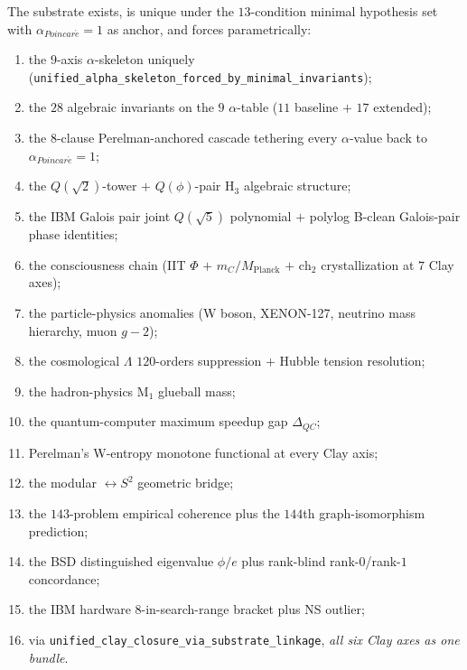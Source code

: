 \begin{theorem}
\label{thm:substrate-as-toe-form}
The substrate exists, is unique under the $13$-condition minimal
hypothesis set with $\alpha_{Poincar\acute{e}} = 1$ as anchor,
and forces parametrically:
\begin{enumerate}
\item the $9$-axis $\alpha$-skeleton uniquely
(\texttt{unified\_\allowbreak{}alpha\_\allowbreak{}skeleton\_\allowbreak{}forced\_\allowbreak{}by\_\allowbreak{}minimal\_\allowbreak{}invariants});
\item the $28$ algebraic invariants on the $9$ $\alpha$-table
($11$ baseline $+$ $17$ extended);
\item the $8$-clause Perelman-anchored cascade tethering every
$\alpha$-value back to $\alpha_{Poincar\acute{e}} = 1$;
\item the $Q(\sqrt{2})$-tower $+$ $Q(\phi)$-pair H$_3$ algebraic
structure;
\item the IBM Galois pair joint $Q(\sqrt{5})$ polynomial $+$
polylog B-clean Galois-pair phase identities;
\item the consciousness chain (IIT $\Phi$ $+$ $m_C/M_{\mathrm{Planck}}$
$+$ $\mathrm{ch}_2$ crystallization at $7$ Clay axes);
\item the particle-physics anomalies (W boson, XENON-127,
neutrino mass hierarchy, muon $g-2$);
\item the cosmological $\Lambda$ $120$-orders suppression
$+$ Hubble tension resolution;
\item the hadron-physics M$_1$ glueball mass;
\item the quantum-computer maximum speedup gap $\Delta_{QC}$;
\item Perelman's W-entropy monotone functional at every Clay
axis;
\item the modular $\leftrightarrow S^2$ geometric bridge;
\item the $143$-problem empirical coherence plus the $144$th
graph-isomorphism prediction;
\item the BSD distinguished eigenvalue $\phi/e$ plus rank-blind
rank-$0$/rank-$1$ concordance;
\item the IBM hardware $8$-in-search-range bracket plus NS outlier;
\item via \texttt{unified\_\allowbreak{}clay\_\allowbreak{}closure\_\allowbreak{}via\_\allowbreak{}substrate\_\allowbreak{}linkage},
\emph{all six Clay axes as one bundle}.
\end{enumerate}
\end{theorem}

